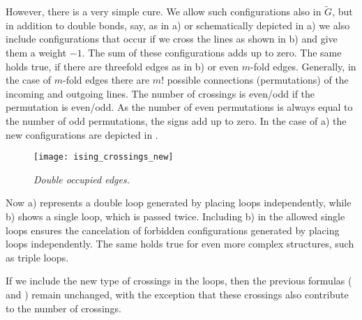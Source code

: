 %
However, there is a very simple cure. We allow such configurations also in $\tilde G$, but in addition to double bonds, say, as in   a) or schematically depicted in  a)
we also include configurations that occur if we cross the lines as shown  in  b) and give them a weight $-1$. 
The sum of these configurations adds up to zero.
The same holds true, if there are threefold
edges as in  b) or even $m$-fold edges. Generally, in the case of $m$-fold edges there are $m!$ possible connections (permutations) of the incoming and outgoing lines. The number of crossings is even/odd  if the permutation is even/odd. As the number of even permutations is always equal to the number of odd permutations, the signs add up to zero.
In the case of  a) the new configurations are depicted in
.
%
\begin{figure}[t]
\texttt{[image: ising\_crossings\_new]}
\caption{{\it Double occupied edges.}\label{fig:ising:crossings:new}}
\end{figure}
%
Now a) represents a double loop generated by placing loops independently, while b)
shows a single loop, which is passed twice. Including b) in the allowed single loops
ensures the cancelation of forbidden configurations generated by placing loops independently.
The same holds true for even more complex structures, such as triple loops.

If we include the new type of crossings in the loops, then the previous formulas
 ( and )  remain unchanged, with the exception that these crossings also contribute to the number of crossings.
 
 

